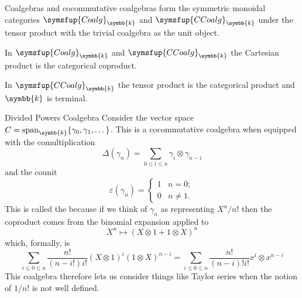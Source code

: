 \documentclass[fleqn]{NotesClass}
\makeatletter
\newcommand{\c@egory}[1]{\symsfup{#1}}
\newcommand{\Coalg}[1][\field]{\c@egory{Coalg}_{#1}}
\newcommand{\CCoalg}[1][\field]{\c@egory{CCoalg}_{#1}}
\renewcommand{\field}{\symbb{k}}
\DeclareMathOperator{\Span}{span}
\makeatother
\begin{document}
    \begin{thm}{}{}
        Coalgebras and cocommutative coalgebras form the symmetric monoidal categories \(\Coalg\) and \(\CCoalg\) under the tensor product with the trivial coalgebra as the unit object.
        
        In \(\Coalg\) and \(\CCoalg\) the Cartesian product is the categorical coproduct.
        
        In \(\CCoalg\) the tensor product is the categorical product and \(\field\) is terminal.
    \end{thm}
    
    \begin{exm}{Divided Powers Coalgebra}{}
        Consider the vector space \(C = \Span_{\field} \{\gamma_0, \gamma_1, \dotsc\}\).
        This is a cocommutative coalgebra when equipped with the comultiplication
        \begin{equation}
            \Delta(\gamma_n) = \sum_{0 \le i \le n} \gamma_i \otimes \gamma_{n-i}
        \end{equation}
        and the counit
        \begin{equation}
            \varepsilon(\gamma_n) = 
            \begin{cases}
                1 & n = 0;\\
                0 & n \ne 1.
            \end{cases}
        \end{equation}
        This is called the  because if we think of \(\gamma_n\) as representing \(X^n/n!\) then the coproduct comes from the binomial expansion applied to
        \begin{equation}
            X^n \mapsto (X \otimes 1 + 1 \otimes X)^n
        \end{equation}
        which, formally, is
        \begin{equation}
            \sum_{i \le 0 \le n} \frac{n!}{(n - i!)i!} (X \otimes 1)^{i}(1 \otimes X)^{n - i} = \sum_{i \le 0 \le n} \frac{n!}{(n - i)! i!} x^i \otimes x^{n-i}
        \end{equation}
        This coalgebra therefore lets us consider things like Taylor series when the notion of \(1/n!\) is not well defined.
    \end{exm}
    
\end{document}
